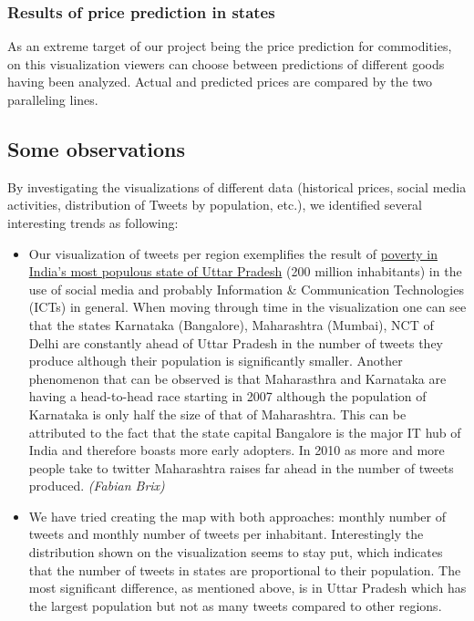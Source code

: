 \subsubsection*{Results of price prediction in states}
As an extreme target of our project being the price prediction for commodities, on this visualization viewers can choose between predictions of different goods having been analyzed. Actual and predicted prices are compared by the two paralleling lines.

\subsection*{Some observations}
By investigating the visualizations of different data (historical prices, social media activities, distribution of Tweets by population, etc.), we identified several interesting trends as following:
\begin{itemize}
\item Our visualization of tweets per region exemplifies the result of \href{http://web.worldbank.org/WBSITE/EXTERNAL/TOPICS/EXTPOVERTY/EXTPA/0,,contentMDK:20208963~menuPK:435735~pagePK:148956~piPK:216618~theSitePK:430367,00.html}{poverty in India's most populous state of Uttar Pradesh} (200 million inhabitants) in the use of social media and probably Information \& Communication Technologies (ICTs) in general. When moving through time in the visualization one can see that the states Karnataka (Bangalore), Maharashtra (Mumbai), NCT of Delhi are constantly ahead of Uttar Pradesh in the number of tweets they produce although their population is significantly smaller. Another phenomenon that can be observed is that Maharasthra and Karnataka are having a head-to-head race starting in 2007 although the population of Karnataka is only half the size of that of Maharashtra. This can be attributed to the fact that the state capital Bangalore is the major IT hub of India and therefore boasts more early adopters. In 2010 as more and more people take to twitter Maharashtra raises far ahead in the number of tweets produced. \emph{(Fabian Brix)}
\item We have tried creating the map with both approaches: monthly number of tweets and monthly number of tweets per inhabitant. Interestingly the distribution shown on the visualization seems to stay put, which indicates that the number of tweets in states are proportional to their population. The most significant difference, as mentioned above, is in Uttar Pradesh which has the largest population but not as many tweets compared to other regions.
\end{itemize}